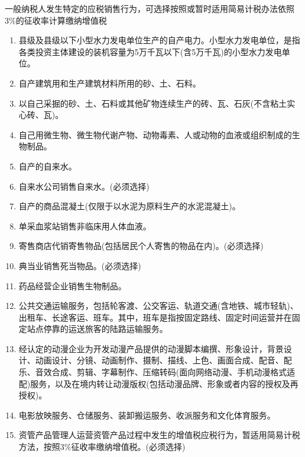 \documentclass[UTF8,12pt]{ctexart}
\numberwithin{equation}{section} %
\numberwithin{figure}{section}
\numberwithin{table}{section}
\begin{document}
	一般纳税人发生特定的应税销售行为，可选择按照或暂时适用简易计税办法依照3\%的征收率计算缴纳增值税
	\begin{enumerate}
		\item 县级及县级以下小型水力发电单位生产的自产电力。小型水力发电单位，是指各类投资主体建设的装机容量为5万千瓦以下(含5万千瓦)的小型水力发电单位。
		
		\item 自产建筑用和生产建筑材料所用的砂、土、石料。
		
		\item 以自己采掘的砂、土、石料或其他矿物连续生产的砖、瓦、石灰(不含粘土实心砖、瓦)。
		
		\item 自己用微生物、微生物代谢产物、动物毒素、人或动物的血液或组织制成的生物制品。
		
		\item 自产的自来水。
		
		\item 自来水公司销售自来水。(必须选择)
		
		\item 自产的商品混凝土(仅限于以水泥为原料生产的水泥混凝土)。
		
		\item 单采血浆站销售非临床用人体血液。
		
		\item 寄售商店代销寄售物品(包括居民个人寄售的物品在内)。(必须选择)
		
		\item 典当业销售死当物品。(必须选择)
		
		\item 药品经营企业销售生物制品。
		
		\item 公共交通运输服务，包括轮客渡、公交客运、轨道交通(含地铁、城市轻轨)、出租车、长途客运、班车。其中，班车是指按固定路线、固定时间运营并在固定站点停靠的运送旅客的陆路运输服务。
		
		\item 经认定的动漫企业为开发动漫产品提供的动漫脚本编撰、形象设计，背景设计、动画设计、分镜、动画制作、摄制、描线、上色、画面合成、配音、配乐、音效合成、剪辑、字幕制作、压缩转码(面向网络动漫、手机动漫格式适配)服务，以及在境内转让动漫版权(包括动漫品牌、形象或者内容的授权及再授权)。
		
		\item 电影放映服务、仓储服务、装卸搬运服务、收派服务和文化体育服务。
		
		\item 资管产品管理人运营资管产品过程中发生的增值税应税行为，暂适用简易计税方法，按照3\%征收率缴纳增值税。(必须选择)
		

\end{enumerate}
\end{document}
